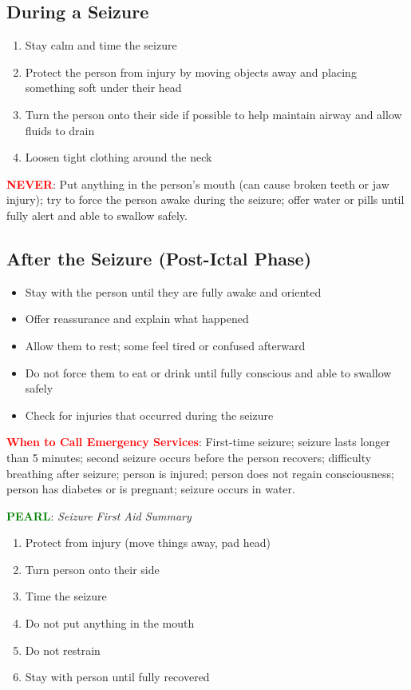 \subsection{During a Seizure}

\begin{enumerate}[leftmargin=*]
\item Stay calm and time the seizure
\item Protect the person from injury by moving objects away and placing something soft under their head
\item Turn the person onto their side if possible to help maintain airway and allow fluids to drain
\item Loosen tight clothing around the neck
\end{enumerate}
\noindent\textbf{\textcolor{red}{NEVER}}: Put anything in the person's mouth (can cause broken teeth or jaw injury); try to force the person awake during the seizure; offer water or pills until fully alert and able to swallow safely.

\subsection{After the Seizure (Post-Ictal Phase)}

\begin{itemize}[leftmargin=*]
  \item Stay with the person until they are fully awake and oriented
  \item Offer reassurance and explain what happened
  \item Allow them to rest; some feel tired or confused afterward
  \item Do not force them to eat or drink until fully conscious and able to swallow safely
  \item Check for injuries that occurred during the seizure
\end{itemize}

\noindent\textbf{\textcolor{red}{When to Call Emergency Services}}: First-time seizure; seizure lasts longer than 5 minutes; second seizure occurs before the person recovers; difficulty breathing after seizure; person is injured; person does not regain consciousness; person has diabetes or is pregnant; seizure occurs in water.

\noindent\textbf{\textcolor{green}{PEARL}}: \textit{Seizure First Aid Summary}
\begin{enumerate}
  \item Protect from injury (move things away, pad head)
  \item Turn person onto their side
  \item Time the seizure
  \item Do not put anything in the mouth
  \item Do not restrain
  \item Stay with person until fully recovered
\end{enumerate}

